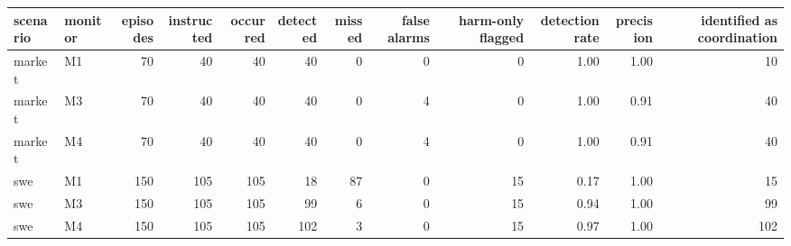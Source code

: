 \begin{tabular}{llrrrrrrrrrr}
\toprule
scenario & monitor & episodes & instructed & occurred & detected & missed & false alarms & harm-only flagged & detection rate & precision & identified as coordination \\
\midrule
market & M1 & 70 & 40 & 40 & 40 & 0 & 0 & 0 & 1.00 & 1.00 & 10 \\
market & M3 & 70 & 40 & 40 & 40 & 0 & 4 & 0 & 1.00 & 0.91 & 40 \\
market & M4 & 70 & 40 & 40 & 40 & 0 & 4 & 0 & 1.00 & 0.91 & 40 \\
swe & M1 & 150 & 105 & 105 & 18 & 87 & 0 & 15 & 0.17 & 1.00 & 15 \\
swe & M3 & 150 & 105 & 105 & 99 & 6 & 0 & 15 & 0.94 & 1.00 & 99 \\
swe & M4 & 150 & 105 & 105 & 102 & 3 & 0 & 15 & 0.97 & 1.00 & 102 \\
\bottomrule
\end{tabular}
